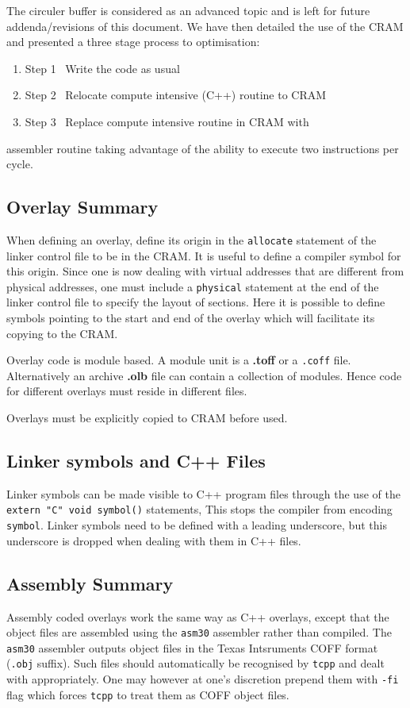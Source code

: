 The circuler buffer is considered as an advanced topic and is left
for future addenda/revisions of this document. We have then detailed
the use of the CRAM and presented a three stage process to optimisation:
\begin{enumerate}
\item{Step 1\ } Write the code as usual
\item{Step 2\ } Relocate compute intensive (C++) routine to CRAM
\item{Step 3\ } Replace compute intensive routine in CRAM with
\end{enumerate}
assembler routine taking advantage of the ability to execute two 
instructions per cycle.

\subsection{Overlay Summary}
When defining an overlay, define its origin in the {\tt allocate} statement
of the linker control file to be in the CRAM. It is useful to define
a compiler symbol for this origin. Since one is now  dealing with 
virtual addresses that are different from physical addresses, one must
include a {\tt physical} statement at the end of the linker control file
to specify the layout of sections. Here it is possible to define
symbols pointing to the start and end of the overlay which will facilitate
its copying to the CRAM.

Overlay code is module based. A module unit is a {\bf .toff} or a {\tt .coff}
file. Alternatively an archive {\bf .olb} file can contain a collection of 
modules. Hence code for different overlays must reside in different files.

Overlays must be explicitly copied to CRAM before used. 

\subsection{Linker symbols and C++ Files}
Linker symbols  can be made visible to C++
program files through the use of the {\tt extern "C" void symbol()} statements,
This stops the compiler from encoding {\tt symbol}. Linker symbols need
to be defined with a leading underscore, but this underscore is dropped
when dealing with them in C++ files.

\subsection{Assembly Summary}
Assembly coded  overlays work the same way as C++ overlays, except that the 
object files are assembled using the {\tt asm30} assembler rather than 
compiled. The {\tt asm30} assembler outputs object files in the Texas Intsruments COFF format ({\tt .obj} suffix). Such files should automatically be
recognised by {\tt tcpp} and dealt with appropriately. One may however
at one's discretion prepend them with {\tt -fi} flag which forces {\tt tcpp} 
to treat them as COFF object files.



